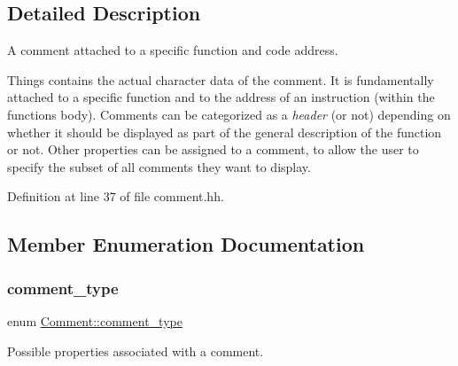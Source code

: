 \subsection{Detailed Description}
A comment attached to a specific function and code address. 

Things contains the actual character data of the comment. It is fundamentally attached to a specific function and to the address of an instruction (within the function\textquotesingle{}s body). Comments can be categorized as a {\itshape header} (or not) depending on whether it should be displayed as part of the general description of the function or not. Other properties can be assigned to a comment, to allow the user to specify the subset of all comments they want to display. 

Definition at line 37 of file comment.\+hh.



\subsection{Member Enumeration Documentation}
\mbox{\label{class_comment_a25e5457bf3deeb109bdef2f532317cf2}} 
\subsubsection{\texorpdfstring{comment\_type}{comment\_type}}
{\footnotesize\ttfamily enum \mbox{\hyperlink{class_comment_a25e5457bf3deeb109bdef2f532317cf2}{Comment\+::comment\+\_\+type}}}



Possible properties associated with a comment. 

